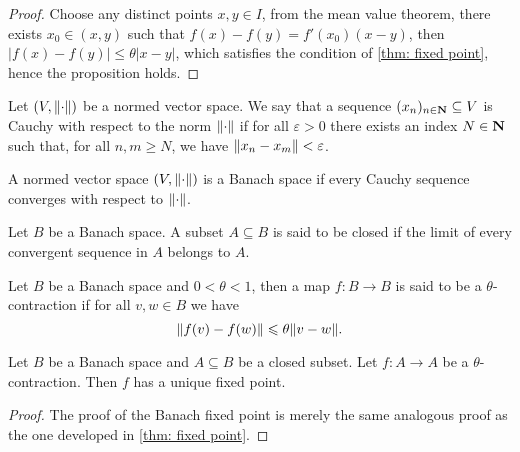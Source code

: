 \begin{proof}
    Choose any distinct points \(x, y \in I\), from the mean value theorem, there
    exists \(x_0 \in (x, y)\) such that \(f(x) - f(y) = f'(x_0)(x - y)\), then
    \(|f(x) - f(y)| \leq \theta |x - y|\), which satisfies the condition of
    \cref{thm: fixed point}, hence the proposition holds.
\end{proof}

\begin{definition}
    Let \((V, \lVert\cdot\rVert)\) be a normed vector space. We say that a sequence
    \((x_n)_{n \in \mathbf{N}} \subseteq V\) is Cauchy with respect to the norm \(\lVert\cdot\rVert\) if for all
    \(\varepsilon > 0\) there exists an index \(N \in \mathbf{N}\) such that, for all \(n, m \geq N\), we
    have \(\lVert x_n - x_m\rVert < \varepsilon\).
\end{definition}


\begin{definition}\label{def: Banach space}
    A normed vector space \((V, \lVert\cdot\rVert)\) is a Banach space if every Cauchy
    sequence converges with respect to \(\lVert\cdot\rVert\).
\end{definition}

\begin{definition}
    Let \(B\) be a Banach space. A subset \(A \subseteq B\) is said to be closed
    if the limit of every convergent sequence in \(A\) belongs to \(A\).
\end{definition}

\begin{definition}[Contraction]
    \label{def:contraction}
    Let \(B\) be a Banach space and \(0 < \theta < 1\), then a map \(f: B \to B\)
    is said to be a \(\theta\)-contraction if for all \(v, w \in B\) we have
    \[
        \lVert f(v) - f(w)\rVert \leqslant \theta \lVert v - w\rVert.
    \]
\end{definition}

\begin{theorem}\label{thm: Banach fixed point}
    Let \(B\) be a Banach space and \(A \subseteq B\) be a closed subset. Let \(f:
    A \to A\) be a \(\theta\)-contraction. Then \(f\) has a unique fixed point.
\end{theorem}

\begin{proof}
    The proof of the Banach fixed point is merely the same analogous proof as the
    one developed in \cref{thm: fixed point}.
\end{proof}

